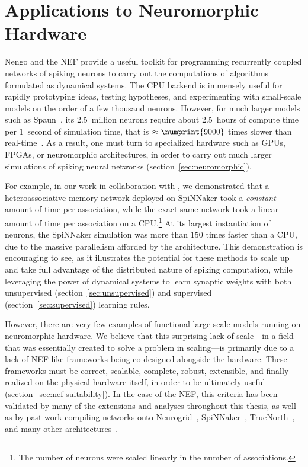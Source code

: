 \chapter{Applications to Neuromorphic Hardware}
\label{chapt:results}

Nengo and the NEF provide a useful toolkit for programming recurrently coupled networks of spiking neurons to carry out the computations of algorithms formulated as dynamical systems.
The CPU backend is immensely useful for rapidly prototyping ideas, testing hypotheses, and experimenting with small-scale models on the order of a few thousand neurons.
However, for much larger models such as Spaun~\citep{eliasmith2012}, its 2.5~million neurons require about 2.5~hours of compute time per $1$~second of simulation time, that is $\approx \numprint{9000}$ times slower than real-time~\citep{stewart2014large, mundy2016real}.
As a result, one must turn to specialized hardware such as GPUs, FPGAs, or neuromorphic architectures, in order to carry out much larger simulations of spiking neural networks (section~\ref{sec:neuromorphic}).

For example, in our work in collaboration with \citet{knight2016}, we demonstrated that a heteroassociative memory network deployed on SpiNNaker took a \emph{constant} amount of time per association, while the exact same network took a linear amount of time per association on a CPU.\footnote{%
The number of neurons were scaled linearly in the number of associations.}
At its largest instantiation of  neurons, the SpiNNaker simulation was more than $150$ times faster than a CPU, due to the massive parallelism afforded by the architecture.
This demonstration is encouraging to see, as it illustrates the potential for these methods to scale up and take full advantage of the distributed nature of spiking computation, while leveraging the power of dynamical systems to learn synaptic weights with both unsupervised (section~\ref{sec:unsupervised}) and supervised (section~\ref{sec:supervised}) learning rules.

However, there are very few examples of functional large-scale models running on neuromorphic hardware.
We believe that this surprising lack of scale---in a field that was essentially created to solve a problem in scaling---is primarily due to a lack of NEF-like frameworks being co-designed alongside the hardware.
These frameworks must be correct, scalable, complete, robust, extensible, and finally realized on the physical hardware itself, in order to be ultimately useful (section~\ref{sec:nef-suitability}).
In the case of the NEF, this criteria has been validated by many of the extensions and analyses throughout this thesis, as well as by past work compiling networks onto
Neurogrid~\citep{dethier2011brain},
SpiNNaker~\citep{mundy2015},
TrueNorth~\citep{fischl2018},
and many other architectures~\citep{naylor2013managing, bekolay2014, corradi2014, wang2014compact, berzish2016, wang2017neuromorphic, rasmussen2018nengodl, blouw2018a}.

